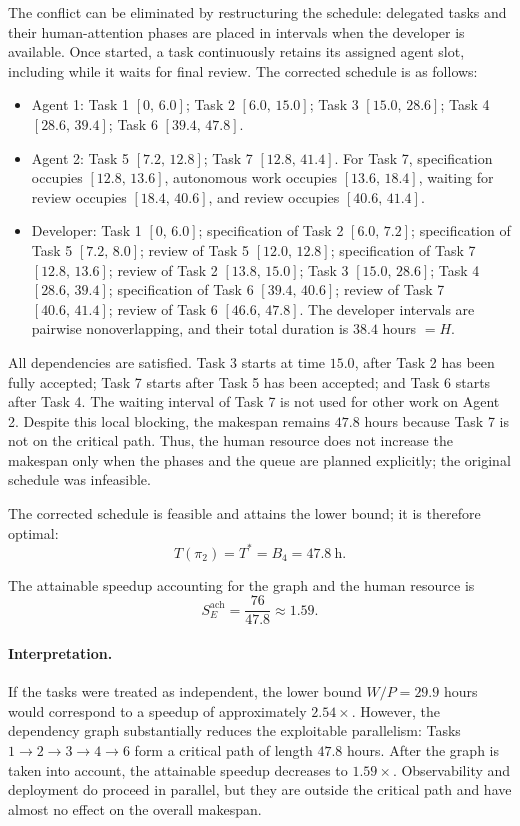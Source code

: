 The conflict can be eliminated by restructuring the schedule: delegated tasks
and their human-attention phases are placed in intervals when the developer is
available. Once started, a task continuously retains its assigned agent slot,
including while it waits for final review. The corrected schedule is as
follows:
\begin{itemize}
  \item Agent 1: Task 1 $[0,\,6.0]$; Task 2 $[6.0,\,15.0]$; Task 3
  $[15.0,\,28.6]$; Task 4 $[28.6,\,39.4]$; Task 6 $[39.4,\,47.8]$.
  \item Agent 2: Task 5 $[7.2,\,12.8]$; Task 7 $[12.8,\,41.4]$.
  For Task 7, specification occupies $[12.8,\,13.6]$, autonomous work occupies
  $[13.6,\,18.4]$, waiting for review occupies $[18.4,\,40.6]$, and review
  occupies $[40.6,\,41.4]$.
  \item Developer: Task 1 $[0,\,6.0]$; specification of Task 2
  $[6.0,\,7.2]$; specification of Task 5 $[7.2,\,8.0]$; review of Task 5
  $[12.0,\,12.8]$; specification of Task 7 $[12.8,\,13.6]$; review of Task 2
  $[13.8,\,15.0]$; Task 3 $[15.0,\,28.6]$; Task 4 $[28.6,\,39.4]$;
  specification of Task 6 $[39.4,\,40.6]$; review of Task 7
  $[40.6,\,41.4]$; review of Task 6 $[46.6,\,47.8]$. The developer intervals
  are pairwise nonoverlapping, and their total duration is $38.4$ hours $= H$.
\end{itemize}
All dependencies are satisfied. Task 3 starts at time $15.0$, after Task 2 has
been fully accepted; Task 7 starts after Task 5 has been accepted; and Task 6
starts after Task 4. The waiting interval of Task 7 is not used for other work
on Agent 2. Despite this local blocking, the makespan remains $47.8$ hours
because Task 7 is not on the critical path. Thus, the human resource does not
increase the makespan only when the phases and the queue are planned
explicitly; the original schedule was infeasible.

The corrected schedule is feasible and attains the lower bound; it is
therefore optimal:
\[
  T(\pi_2)=T^{*}=B_4=47.8~\text{h}.
\]

The attainable speedup accounting for the graph and the human resource is
\[
  S_E^{\text{ach}} = \frac{76}{47.8} \approx 1.59.
\]

\paragraph{Interpretation.}
If the tasks were treated as independent, the lower bound $W/P=29.9$ hours
would correspond to a speedup of approximately $2.54\times$. However, the
dependency graph substantially reduces the exploitable parallelism: Tasks
$1 \to 2 \to 3 \to 4 \to 6$ form a critical path of length $47.8$ hours.
After the graph is taken into account, the attainable speedup decreases to
$1.59\times$. Observability and deployment do proceed in parallel, but they
are outside the critical path and have almost no effect on the overall
makespan.

